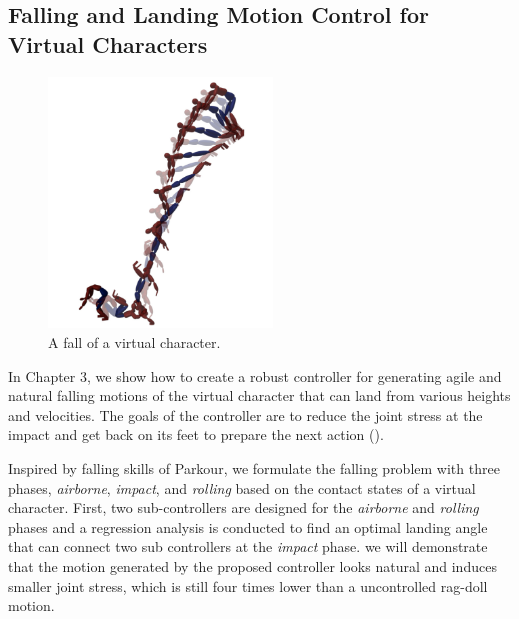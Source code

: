 \subsection{Falling and Landing Motion Control for Virtual Characters}

\begin{figure}[0.55\textwidth]
  \begin{center}
    \includegraphics[width=0.53\textwidth]{images/intro_falling_sequence.png}
  \end{center}
  \caption{A fall of a virtual character.}
  \label{fig:intro_landing}
\end{figure}

In Chapter 3, we show how to create a robust controller for generating 
agile and natural falling motions of the virtual character that can land from 
various heights and velocities.
The goals of the controller are to reduce the joint stress at the impact and
get back on its feet to prepare the next action ().

Inspired by falling skills of Parkour, 
we formulate the falling problem
with three phases, \emph{airborne}, \emph{impact}, and \emph{rolling}
based on the contact states of a virtual character.
First, two sub-controllers are designed for the \emph{airborne} and
\emph{rolling} phases and a regression analysis is conducted to find 
an optimal landing angle that can connect two sub controllers at the
\emph{impact} phase.
we will demonstrate that the motion generated by the proposed controller
looks natural and induces smaller joint stress, which is still four times lower
than a uncontrolled rag-doll motion.


